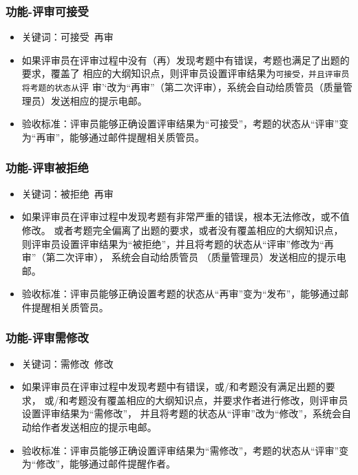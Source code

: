 \documentclass[hyperref, a4paper]{ctexart}
\providecommand{\tightlist}{%
  \setlength{\itemsep}{0pt}\setlength{\parskip}{0pt}}
\begin{document}
\hypertarget{ux529fux80fd-ux8bc4ux5ba1ux53efux63a5ux53d7}{%
\subsubsection{功能-评审可接受}\label{ux529fux80fd-ux8bc4ux5ba1ux53efux63a5ux53d7}}

\begin{itemize}
\tightlist
\item
  关键词：可接受~再审
\item
  如果评审员在评审过程中没有（再）发现考题中有错误，考题也满足了出题的要求，覆盖了
  相应的大纲知识点，则评审员设置评审结果为\texttt{可接受\textquotesingle{}\textquotesingle{}，并且评审员将考题的状态从}评
  审'`改为``再审''（第二次评审），系统会自动给质管员（质量管理员）发送相应的提示电邮。
\item
  验收标准：评审员能够正确设置评审结果为``可接受''，考题的状态从``评审''变为``再审''，能够通过邮件提醒相关质管员。
\end{itemize}

\hypertarget{ux529fux80fd-ux8bc4ux5ba1ux88abux62d2ux7edd}{%
\subsubsection{功能-评审被拒绝}\label{ux529fux80fd-ux8bc4ux5ba1ux88abux62d2ux7edd}}

\begin{itemize}
\tightlist
\item
  关键词：被拒绝~再审
\item
  如果评审员在评审过程中发现考题有非常严重的错误，根本无法修改，或不值修改。
  或者考题完全偏离了出题的要求，或者没有覆盖相应的大纲知识点，
  则评审员设置评审结果为``被拒绝''，并且将考题的状态从``评审''修改为``再审''（第二次评审），
  系统会自动给质管员 （质量管理员）发送相应的提示电邮。
\item
  验收标准：评审员能够正确设置考题的状态从``再审''变为``发布''，能够通过邮件提醒相关质管员。
\end{itemize}

\hypertarget{ux529fux80fd-ux8bc4ux5ba1ux9700ux4feeux6539}{%
\subsubsection{功能-评审需修改}\label{ux529fux80fd-ux8bc4ux5ba1ux9700ux4feeux6539}}

\begin{itemize}
\tightlist
\item
  关键词：需修改~修改
\item
  如果评审员在评审过程中发现考题中有错误，或/和考题没有满足出题的要求，
  或/和考题没有覆盖相应的大纲知识点，并要求作者进行修改，则评审员设置评审结果为``需修改''，
  并且将考题的状态从``评审''改为``修改''，系统会自动给作者发送相应的提示电邮。
\item
  验收标准：评审员能够正确设置评审结果为``需修改''，考题的状态从``评审''变为``修改''，能够通过邮件提醒作者。
\end{itemize}
\end{document}
